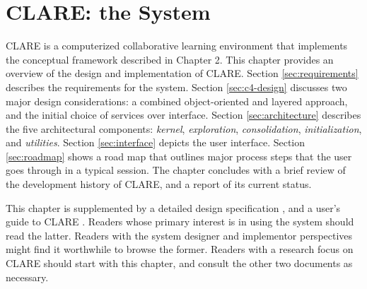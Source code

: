 

\setcounter{chapter}{3}
\chapter{CLARE: the System}
\label{sec:clare}

CLARE is a computerized collaborative learning environment that implements
the conceptual framework described in Chapter 2. This chapter provides an
overview of the design and implementation of CLARE. Section
\ref{sec:requirements} describes the requirements for the system. Section
\ref{sec:c4-design} discusses two major design considerations: a combined
object-oriented and layered approach, and the initial choice of services
over interface. Section \ref{sec:architecture} describes the five
architectural components: {\it kernel\/}, {\it exploration\/}, {\it
consolidation\/}, {\it initialization\/}, and {\it utilities\/}. Section
\ref{sec:interface} depicts the user interface. Section \ref{sec:roadmap}
shows a road map that outlines major process steps that the user goes
through in a typical session. The chapter concludes with a brief review of
the development history of CLARE, and a report of its current status.

This chapter is supplemented by a detailed design specification
\cite{csdl-93-24}, and a user's guide to CLARE \cite{csdl-93-15}. Readers
whose primary interest is in using the system should read the latter.
Readers with the system designer and implementor perspectives might find it
worthwhile to browse the former.  Readers with a research focus on CLARE
should start with this chapter, and consult the other two documents as
necessary.



